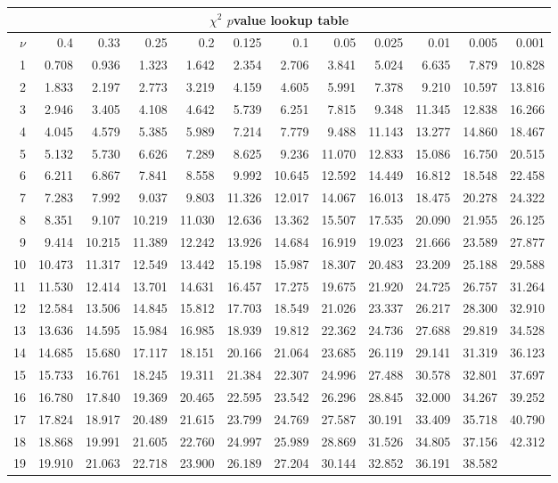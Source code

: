 \clearpage
\begin{center}
\begin{tabular}
      {|r||rrr|rrr|rrr|rr|}
\multicolumn{12}{c}{$\chi^2$ $p$value lookup table}\\
\hline
$\nu$&0.4&0.33&0.25&0.2&0.125&0.1&0.05&0.025&0.01&0.005
     &0.001\\
    \hline\hline
1&0.708&0.936&1.323&1.642&2.354&2.706&3.841&5.024&6.635&7.879&10.828\\
2&1.833&2.197&2.773&3.219&4.159&4.605&5.991&7.378&9.210&10.597&13.816\\
3&2.946&3.405&4.108&4.642&5.739&6.251&7.815&9.348&11.345&12.838&16.266\\
4&4.045&4.579&5.385&5.989&7.214&7.779&9.488&11.143&13.277&14.860&18.467\\
5&5.132&5.730&6.626&7.289&8.625&9.236&11.070&12.833&15.086&16.750&20.515\\
\hline
6&6.211&6.867&7.841&8.558&9.992&10.645&12.592&14.449&16.812&18.548&22.458\\
7&7.283&7.992&9.037&9.803&11.326&12.017&14.067&16.013&18.475&20.278&24.322\\
8&8.351&9.107&10.219&11.030&12.636&13.362&15.507&17.535&20.090&21.955&26.125\\
9&9.414&10.215&11.389&12.242&13.926&14.684&16.919&19.023&21.666&23.589
 &27.877\\
10&10.473&11.317&12.549&13.442&15.198&15.987&18.307&20.483&23.209&25.188
  &29.588\\
\hline
11&11.530&12.414&13.701&14.631&16.457&17.275&19.675&21.920&24.725&26.757
  &31.264\\
12&12.584&13.506&14.845&15.812&17.703&18.549&21.026&23.337&26.217&28.300
  &32.910\\
13&13.636&14.595&15.984&16.985&18.939&19.812&22.362&24.736&27.688&29.819
  &34.528\\
14&14.685&15.680&17.117&18.151&20.166&21.064&23.685&26.119&29.141&31.319
  &36.123\\
15&15.733&16.761&18.245&19.311&21.384&22.307&24.996&27.488&30.578&32.801
  &37.697\\
\hline
16&16.780&17.840&19.369&20.465&22.595&23.542&26.296&28.845&32.000&34.267
  &39.252\\
17&17.824&18.917&20.489&21.615&23.799&24.769&27.587&30.191&33.409&35.718
  &40.790\\
18&18.868&19.991&21.605&22.760&24.997&25.989&28.869&31.526&34.805&37.156
  &42.312\\
19&19.910&21.063&22.718&23.900&26.189&27.204&30.144&32.852&36.191&38.582

\end{tabular}
\end{center}
